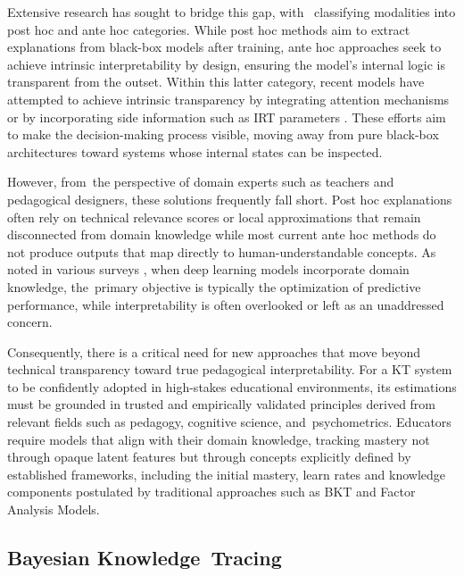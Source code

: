 \documentclass[applsci,article,accept,moreauthors,pdftex]{Definitions/mdpi}
\begin{document}
{Extensive research has sought to bridge this gap, with~{\citet{bai2024survey}} classifying modalities into {post hoc} and {ante hoc} categories.}
{While {post hoc} methods aim to extract explanations from black-box models after training, {ante hoc} approaches seek to achieve intrinsic interpretability by design, ensuring the model's internal logic is transparent from the outset.}
{Within this latter category, recent models have attempted to achieve intrinsic transparency by integrating attention mechanisms {\citep{Pandey2019384, ghosh2020context}} or by incorporating side information such as IRT parameters {\citep{yeung2019deep, su2021time, chen2023improving}}.}
{These efforts aim to make the decision-making process visible, moving away from pure black-box architectures toward systems whose internal states can be inspected.}

{However, from~the perspective of domain experts such as teachers and pedagogical designers, these solutions frequently fall short.}
{Post hoc explanations often rely on technical relevance scores or local approximations that remain disconnected from domain knowledge {\citep{rudin2019stop}} while most current ante hoc methods do not produce outputs that map directly to human-understandable concepts.}
{As noted in various surveys {\citep{bai2024survey, vonrueden2021informed}}, when deep learning models incorporate domain knowledge, the~primary objective is typically the optimization of predictive performance, while interpretability is often overlooked or left as an unaddressed concern.}

{Consequently, there is a critical need for new approaches that move beyond technical transparency toward true pedagogical interpretability.}
{For a KT system to be confidently adopted in high-stakes educational environments, its estimations must be grounded in trusted and empirically validated principles derived from relevant fields such as pedagogy, cognitive science, and~psychometrics.}
{Educators require models that align with their domain knowledge, tracking mastery not through opaque latent features but through concepts explicitly defined by established frameworks, including the initial mastery, learn rates and knowledge components postulated by traditional approaches such as BKT and Factor Analysis Models.}

\subsection{Bayesian Knowledge~Tracing} \label{sec_bkt}
\end{document}
